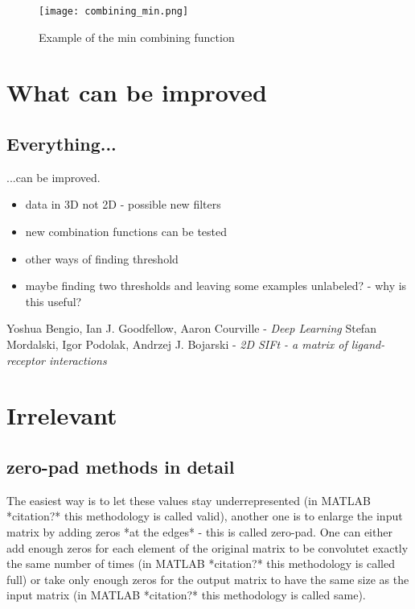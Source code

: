 \documentclass[a4paper,10pt]{report}
\begin{document}
      \begin{figure}[h!]
	  \centering
	  \texttt{[image: combining\_min.png]}
	  \caption{Example of the min combining function}
	  \label{fig:combining}
	\end{figure} 
	
      
     
	
  \chapter{What can be improved} %
    \section{Everything...}
      ...can be improved.\\
      \begin{itemize}
	   \item data in 3D not 2D - possible new filters
	   \item new combination functions can be tested
	   \item other ways of finding threshold
	   \item maybe finding two thresholds and leaving some examples unlabeled? - why is this useful?
      \end{itemize}
      

  \begin{thebibliography}{99}
      Yoshua Bengio, Ian J. Goodfellow, Aaron Courville - \emph{Deep Learning}
      Stefan Mordalski, Igor Podolak, Andrzej J. Bojarski - \emph{2D SIFt - a matrix of ligand-receptor interactions}
    
  \end{thebibliography}
  
  \chapter{Irrelevant} %
    \section{zero-pad methods in detail}
      The easiest way is to let these values stay underrepresented (in MATLAB *citation?* this methodology is called valid), another one is to enlarge the input matrix by adding zeros *at the edges* - this is called zero-pad. One can either add enough zeros for each element of the original matrix to be convolutet exactly the same number of times (in MATLAB *citation?* this methodology is called full) or take only enough zeros for the output matrix to have the same size as the input matrix (in MATLAB *citation?* this methodology is called same).\\
	  
\end{document}

